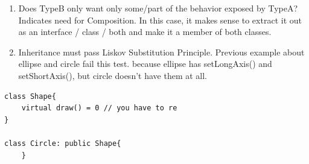 \documentclass[a4paper,11pt,twoside]{book}
\begin{document}
\begin{itemize}
\begin{enumerate}
		\item Does TypeB only want only some/part of the behavior exposed by TypeA? Indicates need for Composition. In this case, it makes sense to extract it out as an interface / class / both and make it a member of both classes.
		
		\item Inheritance must pass Liskov Substitution Principle. Previous example about ellipse and circle fail this test. because ellipse has setLongAxis() and setShortAxis(), but circle doesn't have them at all.
	\end{enumerate}

\begin{lstlisting}[numbers=none]
class Shape{
	virtual draw() = 0 // you have to re
}
	
class Circle: public Shape{
	}
\end{lstlisting}


\end{itemize}
\end{document}
